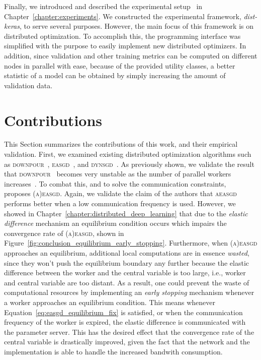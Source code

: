 Finally, we introduced and described the experimental setup~\cite{dist_keras} in Chapter~\ref{chapter:experiments}. We constructed the experimental framework, \emph{dist-keras}, to serve several purposes. However, the main focus of this framework is on distributed optimization. To accomplish this, the programming interface was simplified with the purpose to easily implement new distributed optimizers. In addition, since validation and other training metrics can be computed on different nodes in parallel with ease, because of the provided utility classes, a better statistic of a model can be obtained by simply increasing the amount of validation data.

\section{Contributions}
\label{sec:conclusion_contributions}

This Section summarizes the contributions of this work, and their empirical validation. First, we examined existing distributed optimization algorithms such as \textsc{downpour}~\cite{dean2012large}, \textsc{easgd}~\cite{zhang2015deep}, and \textsc{dynsgd}~\cite{jiang2017heterogeneity}. As previously shown, we validate the result that \textsc{downpour}~\cite{dean2012large} becomes very unstable as the number of parallel workers increases~\cite{implicitmomentum, hadjis2016omnivore}. To combat this, and to solve the communication constraints,~\cite{zhang2015deep} proposes \textsc{(a)easgd}. Again, we validate the claim of the authors that \textsc{aeasgd} performs better when a low communication frequency is used. However, we showed in Chapter~\ref{chapter:distributed_deep_learning} that due to the \emph{elastic difference} mechanism an equilibrium condition occurs which impairs the convergence rate of \textsc{(a)easgd}, shown in Figure~\ref{fig:conclusion_equilibrium_early_stopping}. Furthermore, when \textsc{(a)easgd} approaches an equilibrium, additional local computations are in essence \emph{wasted}, since they won't push the equilibrium boundary any further because the elastic difference between the worker and the central variable is too large, i.e., worker and central variable are too distant. As a result, one could prevent the waste of computational resources by implementing an \emph{early stopping} mechanism whenever a worker approaches an equilibrium condition. This means whenever Equation~\ref{eq:easgd_equilibrium_fix} is satisfied, or when the communication frequency of the worker is expired, the elastic difference is communicated with the parameter server. This has the desired effect that the convergence rate of the central variable is drastically improved, given the fact that the network and the implementation is able to handle the increased bandwith consumption.\\

